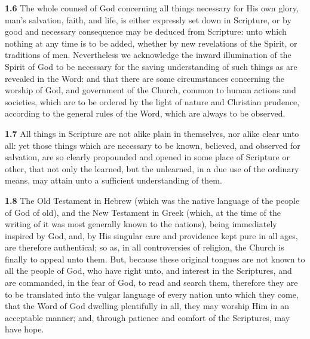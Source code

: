 \par\textbf{1.6} The whole counsel of God concerning all things necessary for His own glory, man's salvation, faith, and life, is either expressly set down in Scripture, or by good and necessary consequence may be deduced from Scripture: unto which nothing at any time is to be added, whether by new revelations of the Spirit, or traditions of men. Nevertheless we acknowledge the inward illumination of the Spirit of God to be necessary for the saving understanding of such things as are revealed in the Word: and that there are some circumstances concerning the worship of God, and government of the Church, common to human actions and societies, which are to be ordered by the light of nature and Christian prudence, according to the general rules of the Word, which are always to be observed.   

\par\textbf{1.7} All things in Scripture are not alike plain in themselves, nor alike clear unto all: yet those things which are necessary to be known, believed, and observed for salvation, are so clearly propounded and opened in some place of Scripture or other, that not only the learned, but the unlearned, in a due use of the ordinary means, may attain unto a sufficient understanding of them.   

\par\textbf{1.8} The Old Testament in Hebrew (which was the native language of the people of God of old), and the New Testament in Greek (which, at the time of the writing of it was most generally known to the nations), being immediately inspired by God, and, by His singular care and providence kept pure in all ages, are therefore authentical; so as, in all controversies of religion, the Church is finally to appeal unto them. But, because these original tongues are not known to all the people of God, who have right unto, and interest in the Scriptures, and are commanded, in the fear of God, to read and search them, therefore they are to be translated into the vulgar language of every nation unto which they come, that the Word of God dwelling plentifully in all, they may worship Him in an acceptable manner; and, through patience and comfort of the Scriptures, may have hope.   

